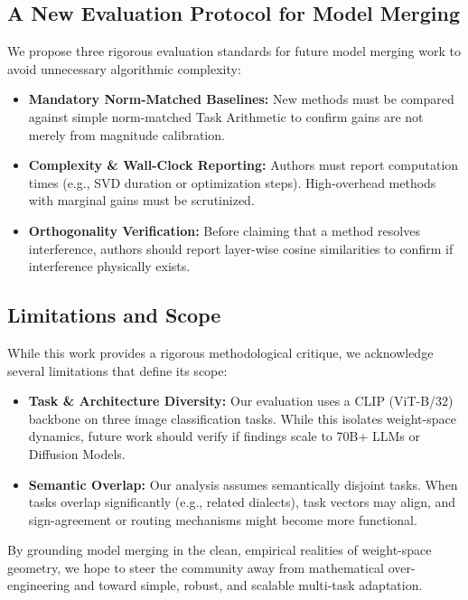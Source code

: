 \documentclass{article}
\begin{document}
\subsection{A New Evaluation Protocol for Model Merging}

We propose three rigorous evaluation standards for future model merging work to avoid unnecessary algorithmic complexity:

\begin{itemize}
    \item \textbf{Mandatory Norm-Matched Baselines:} New methods must be compared against simple norm-matched Task Arithmetic to confirm gains are not merely from magnitude calibration.
    \item \textbf{Complexity \& Wall-Clock Reporting:} Authors must report computation times (e.g., SVD duration or optimization steps). High-overhead methods with marginal gains must be scrutinized.
    \item \textbf{Orthogonality Verification:} Before claiming that a method resolves interference, authors should report layer-wise cosine similarities to confirm if interference physically exists.
\end{itemize}

\subsection{Limitations and Scope}

While this work provides a rigorous methodological critique, we acknowledge several limitations that define its scope:
\begin{itemize}
    \item \textbf{Task \& Architecture Diversity:} Our evaluation uses a CLIP (ViT-B/32) backbone on three image classification tasks. While this isolates weight-space dynamics, future work should verify if findings scale to 70B+ LLMs or Diffusion Models.
    \item \textbf{Semantic Overlap:} Our analysis assumes semantically disjoint tasks. When tasks overlap significantly (e.g., related dialects), task vectors may align, and sign-agreement or routing mechanisms might become more functional.
\end{itemize}

By grounding model merging in the clean, empirical realities of weight-space geometry, we hope to steer the community away from mathematical over-engineering and toward simple, robust, and scalable multi-task adaptation.
\end{document}
